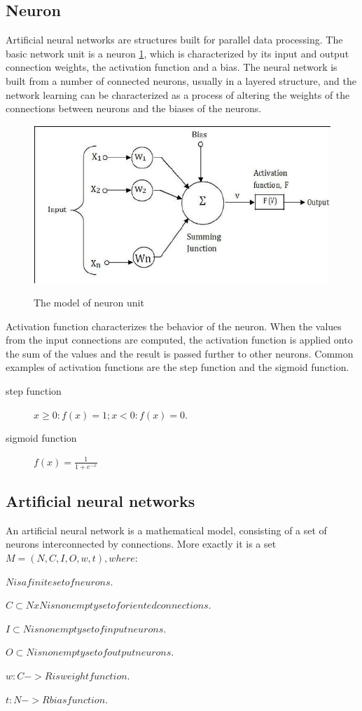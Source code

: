 \subsection{Neuron}
Artificial neural networks are structures built for parallel data processing. The basic network unit is a neuron \ref{fig:neuron}, which is characterized by its input and output connection weights, the activation function and a bias. The neural network is built from a number of connected neurons, usually in a layered structure, and the network learning can be characterized as a process of altering the weights of the connections between neurons and the biases of the neurons.

\begin{figure}
\centering
\includegraphics[width=.5\linewidth]{ext/neuron.png}
\label{fig:neuron}
\caption{The model of neuron unit}
\end{figure}

Activation function characterizes the behavior of the neuron. When the values from the input connections are computed, the activation function is applied onto the sum of the values and the result is passed further to other neurons. Common examples of activation functions are the step function and the sigmoid function.

\begin{description}
	\item [step function] $ x \geq 0: f(x) = 1; x < 0: f(x) = 0. $
	\item [sigmoid function] $ f(x) = \frac{1}{1+e^{-x}} $
\end{description}

\subsection{Artificial neural networks}
An artificial neural network is a mathematical model, consisting of a set of neurons interconnected by connections.
More exactly it is a set 
$M  =  (N,C,I,O,w,t),  where: $
\begin{description}
\item $N  is  a  finite  set  of  neurons.$
\item $C \subset N x N  is  nonempty  set  of  oriented  connections.$
\item $I \subset N  is  nonempty  set  of  input  neurons.$
\item $O \subset N  is  nonempty  set  of  output  neurons.$
\item $w : C -> R  is  weight  function.$
\item $t : N->R  bias  function.$
\end{description}

